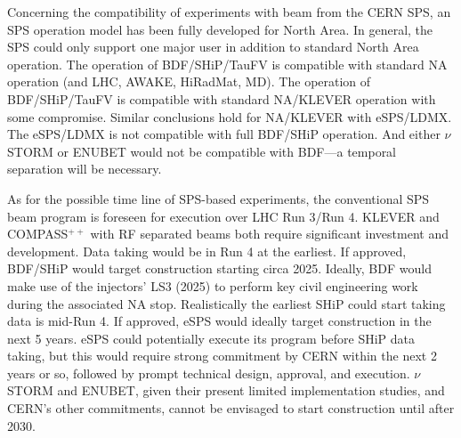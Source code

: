 Concerning the compatibility of experiments with beam from the CERN SPS, an SPS operation model has been fully developed for North Area. In general, the SPS could only support one major user in addition to standard North Area operation. The operation of BDF/SHiP/TauFV \cite{id12,id129,id102} is compatible with standard NA operation (and LHC, AWAKE, HiRadMat, MD). The operation of BDF/SHiP/TauFV is compatible with standard NA/KLEVER operation with some compromise. Similar conclusions hold for NA/KLEVER with eSPS/LDMX. The eSPS/LDMX is not compatible with full BDF/SHiP operation. And either $\nu$STORM or ENUBET would not be compatible with BDF---a temporal separation will be necessary.

As for the possible time line of SPS-based experiments, the conventional SPS beam program is foreseen for execution over LHC Run 3/Run 4. KLEVER and COMPASS$^{++}$ with RF separated beams both require significant investment and development. Data taking would be in Run 4 at the earliest.
If approved, BDF/SHiP would target construction starting circa 2025. Ideally, BDF would make use of the injectors' LS3 (2025) to perform key civil engineering work during the associated NA stop. Realistically the earliest SHiP could start taking data is mid-Run 4.
If approved, eSPS would ideally target construction in the next 5 years. eSPS could potentially execute its program before SHiP data taking, but this would require strong commitment by CERN within the next 2 years or so, followed by prompt technical design, approval, and execution.
$\nu$STORM and ENUBET, given their present limited implementation studies, and CERN's other commitments, cannot be envisaged to start construction until after 2030.


